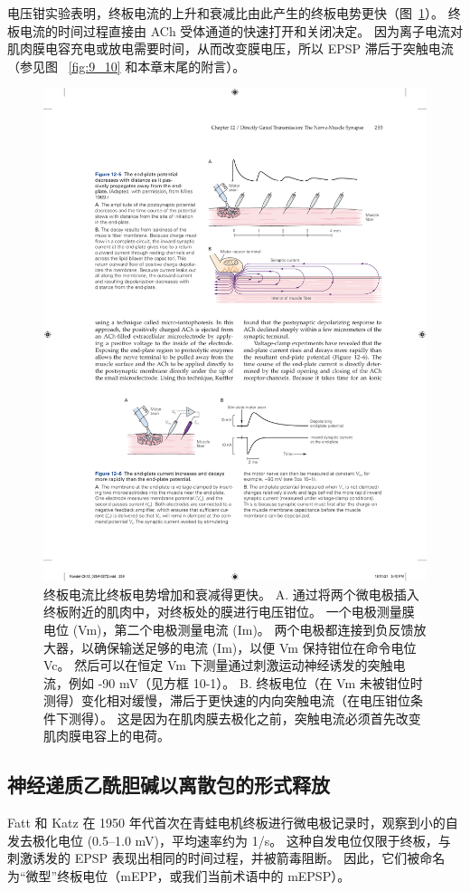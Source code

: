 电压钳实验表明，终板电流的上升和衰减比由此产生的终板电势更快（图~\ref{fig:12_6}）。
终板电流的时间过程直接由 ACh 受体通道的快速打开和关闭决定。
因为离子电流对肌肉膜电容充电或放电需要时间，从而改变膜电压，所以 EPSP 滞后于突触电流（参见图 ~\ref{fig:9_10} 和本章末尾的附言）。

\begin{figure}[htbp]
	\centering
	\includegraphics[width=0.7\linewidth]{chap12/fig_12_6}
	\caption{终板电流比终板电势增加和衰减得更快。 A. 通过将两个微电极插入终板附近的肌肉中，对终板处的膜进行电压钳位。 一个电极测量膜电位 (Vm)，第二个电极测量电流 (Im)。 两个电极都连接到负反馈放大器，以确保输送足够的电流 (Im)，以便 Vm 保持钳位在命令电位 Vc。 然后可以在恒定 Vm 下测量通过刺激运动神经诱发的突触电流，例如 -90 mV（见方框 10-1）。 B. 终板电位（在 Vm 未被钳位时测得）变化相对缓慢，滞后于更快速的内向突触电流（在电压钳位条件下测得）。 这是因为在肌肉膜去极化之前，突触电流必须首先改变肌肉膜电容上的电荷。}
	\label{fig:12_6}
\end{figure}



\subsection{神经递质乙酰胆碱以离散包的形式释放}

Fatt 和 Katz 在 1950 年代首次在青蛙电机终板进行微电极记录时，观察到小的自发去极化电位 (0.5–1.0 mV)，平均速率约为 1/s。 
这种自发电位仅限于终板，与刺激诱发的 EPSP 表现出相同的时间过程，并被箭毒阻断。 
因此，它们被命名为“微型”终板电位（mEPP，或我们当前术语中的 mEPSP）。


